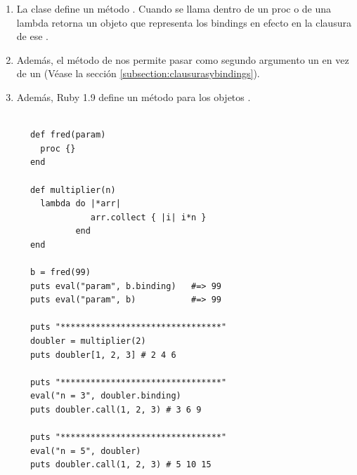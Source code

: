\begin{enumerate}
\item 
La clase  define un método .
Cuando se llama dentro de un proc o de una lambda retorna un objeto 
 que representa los bindings en efecto en la clausura
de ese \Proc{}.

\item 
Además, el método de \Kernel{}  nos permite pasar como segundo argumento un \Proc{} en vez de un \Binding{}
(Véase la sección \ref{subsection:clausurasybindings}).

\item 
Además, Ruby 1.9 define un método  para los objetos \Binding{}.
\end{enumerate}


  \begin{latexonly}
    \begin{lstlisting}

      def fred(param)
        proc {}
      end
      
      def multiplier(n)
        lambda do |*arr| 
                  arr.collect { |i| i*n } 
               end
      end
      
      b = fred(99)
      puts eval("param", b.binding)   #=> 99
      puts eval("param", b)           #=> 99
      
      puts "********************************"
      doubler = multiplier(2)
      puts doubler[1, 2, 3] # 2 4 6
      
      puts "********************************"
      eval("n = 3", doubler.binding)
      puts doubler.call(1, 2, 3) # 3 6 9
      
      puts "********************************"
      eval("n = 5", doubler)
      puts doubler.call(1, 2, 3) # 5 10 15

    \end{lstlisting}
  \end{latexonly}
